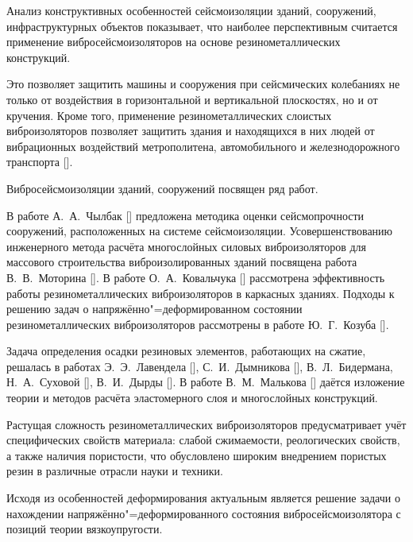 Анализ конструктивных особенностей сейсмоизоляции зданий, сооружений, инфраструктурных объектов показывает, что наиболее перспективным считается применение вибросейсмоизоляторов на основе резинометаллических конструкций. 

Это позволяет защитить машины и сооружения при сейсмических колебаниях не только от воздействия в горизонтальной и вертикальной плоскостях, но и от кручения. Кроме того, применение резинометаллических слоистых виброизоляторов позволяет защитить здания и находящихся в них людей от вибрационных воздействий метрополитена, автомобильного и железнодорожного транспорта []. 



Вибросейсмоизоляции зданий, сооружений посвящен ряд работ. 

В работе А.~А.~Чылбак [] предложена методика оценки сейсмопрочности сооружений, расположенных на системе сейсмоизоляции. Усовершенствованию инженерного метода расчёта многослойных силовых виброизоляторов для массового строительства виброизолированных зданий посвящена работа В.~В.~Моторина []. В работе О.~А.~Ковальчука [] рассмотрена эффективность работы резинометаллических виброизоляторов в каркасных зданиях. Подходы к решению задач о напряжённо"=деформированном состоянии  резинометаллических виброизоляторов рассмотрены в работе Ю.~Г.~Козуба []. 

Задача определения осадки резиновых элементов, работающих на сжатие, решалась в работах Э.~Э.~Лавендела [], С.~И.~Дымникова [], В.~Л.~Бидермана, Н.~А.~Суховой [], В.~И.~Дырды []. В работе В.~М.~Малькова [] даётся изложение теории и методов расчёта эластомерного слоя и многослойных конструкций.



Растущая сложность резинометаллических виброизоляторов предусматривает учёт специфических свойств материала: слабой сжимаемости, реологических свойств, а также наличия пористости, что обусловлено широким внедрением пористых резин в различные отрасли науки и техники. 

Исходя из особенностей деформирования актуальным является решение задачи о нахождении напряжённо"=деформированного состояния вибросейсмоизолятора с позиций теории вязкоупругости.



